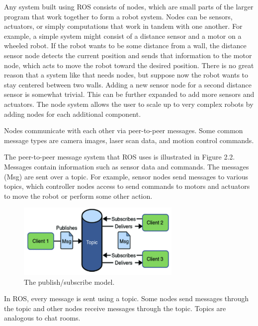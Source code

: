 \documentclass[twoside]{article}
\begin{document}
Any system built using ROS consists of nodes, which are small parts of the larger program that work together to form a robot system. Nodes can be sensors, actuators, or simply computations that work in tandem with one another. For example, a simple system might consist of a distance sensor and a motor on a wheeled robot. If the robot wants to be some distance from a wall, the distance sensor node detects the current position and sends that information to the motor node, which acts to move the robot toward the desired position. There is no great reason that a system like that needs nodes, but suppose now the robot wants to stay centered between two walls. Adding a new sensor node for a second distance sensor is somewhat trivial. This can be further expanded to add more sensors and actuators. The node system allows the user to scale up to very complex robots by adding nodes for each additional component.\\

\begin{frm-def}[Message]
Nodes communicate with each other via peer-to-peer messages. Some common message types are camera images, laser scan data, and motion control commands.
\end{frm-def}

The peer-to-peer message system that ROS uses is illustrated in Figure 2.2. Messages contain information such as sensor data and commands. The messages (Msg) are sent over a topic. For example, sensor nodes send messages to various topics, which controller nodes access to send commands to motors and actuators to move the robot or perform some other action.\\

\begin{figure}[ht]
\centering
\includegraphics[width=0.7\textwidth]{ChatRoom}
\caption{The publish/subscribe model.}
\end{figure}

\begin{frm-def}[Topic]
In ROS, every message is sent using a topic. Some nodes send messages through the topic and other nodes receive messages through the topic. Topics are analogous to chat rooms.
\end{frm-def}
\end{document}
